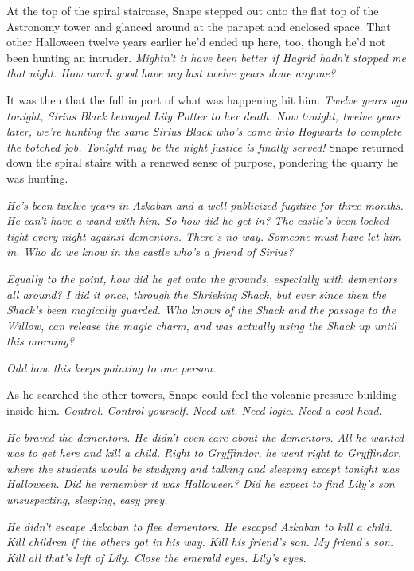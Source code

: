 \documentclass[a4paper,11pt]{article}
\begin{document}
At the top of the spiral staircase, Snape stepped out onto the flat top of the Astronomy tower and glanced around at the parapet and enclosed space. That other Halloween twelve years earlier he'd ended up here, too, though he'd not been hunting an intruder. \emph{Mightn't it have been better if Hagrid hadn't stopped me that night. How much good have my last twelve years done anyone?}

It was then that the full import of what was happening hit him. \emph{Twelve years ago tonight, Sirius Black betrayed Lily Potter to her death. Now tonight, twelve years later, we're hunting the same Sirius Black who's come into Hogwarts to complete the botched job. Tonight may be the night justice is finally served!} Snape returned down the spiral stairs with a renewed sense of purpose, pondering the quarry he was hunting.

\emph{He's been twelve years in Azkaban and a well-publicized fugitive for three months. He can't have a wand with him. So how did he get in? The castle's been locked tight every night against dementors. There's no way. Someone must have let him in. Who do we know in the castle who's a friend of Sirius?}

\emph{Equally to the point, how did he get onto the grounds, especially with dementors all around? I did it once, through the Shrieking Shack, but ever since then the Shack's been magically guarded. Who knows of the Shack and the passage to the Willow, can release the magic charm, and was actually using the Shack up until this morning?}

\emph{Odd how this keeps pointing to one person.}

As he searched the other towers, Snape could feel the volcanic pressure building inside him. \emph{Control. Control yourself. Need wit. Need logic. Need a cool head.}

\emph{He braved the dementors. He didn't even care about the dementors. All he wanted was to get here and kill a child. Right to Gryffindor, he went right to Gryffindor, where the students would be studying and talking and sleeping except tonight was Halloween. Did he remember it was Halloween? Did he expect to find Lily's son unsuspecting, sleeping, easy prey.}

\emph{He didn't escape Azkaban to flee dementors. He escaped Azkaban to kill a child. Kill children if the others got in his way. Kill his friend's son. My friend's son. Kill all that's left of Lily. Close the emerald eyes. Lily's eyes.}
\end{document}
